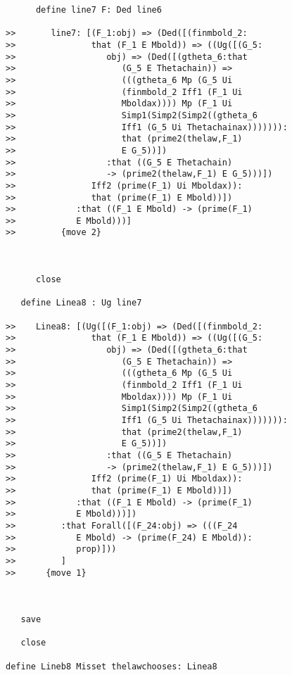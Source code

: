 \documentclass[12pt]{article}
\begin{document}
\begin{verbatim}
      define line7 F: Ded line6

>>       line7: [(F_1:obj) => (Ded([(finmbold_2:
>>               that (F_1 E Mbold)) => ((Ug([(G_5:
>>                  obj) => (Ded([(gtheta_6:that
>>                     (G_5 E Thetachain)) =>
>>                     (((gtheta_6 Mp (G_5 Ui
>>                     (finmbold_2 Iff1 (F_1 Ui
>>                     Mboldax)))) Mp (F_1 Ui
>>                     Simp1(Simp2(Simp2((gtheta_6
>>                     Iff1 (G_5 Ui Thetachainax))))))):
>>                     that (prime2(thelaw,F_1)
>>                     E G_5))])
>>                  :that ((G_5 E Thetachain)
>>                  -> (prime2(thelaw,F_1) E G_5)))])
>>               Iff2 (prime(F_1) Ui Mboldax)):
>>               that (prime(F_1) E Mbold))])
>>            :that ((F_1 E Mbold) -> (prime(F_1)
>>            E Mbold)))]
>>         {move 2}



      close

   define Linea8 : Ug line7

>>    Linea8: [(Ug([(F_1:obj) => (Ded([(finmbold_2:
>>               that (F_1 E Mbold)) => ((Ug([(G_5:
>>                  obj) => (Ded([(gtheta_6:that
>>                     (G_5 E Thetachain)) =>
>>                     (((gtheta_6 Mp (G_5 Ui
>>                     (finmbold_2 Iff1 (F_1 Ui
>>                     Mboldax)))) Mp (F_1 Ui
>>                     Simp1(Simp2(Simp2((gtheta_6
>>                     Iff1 (G_5 Ui Thetachainax))))))):
>>                     that (prime2(thelaw,F_1)
>>                     E G_5))])
>>                  :that ((G_5 E Thetachain)
>>                  -> (prime2(thelaw,F_1) E G_5)))])
>>               Iff2 (prime(F_1) Ui Mboldax)):
>>               that (prime(F_1) E Mbold))])
>>            :that ((F_1 E Mbold) -> (prime(F_1)
>>            E Mbold)))])
>>         :that Forall([(F_24:obj) => (((F_24
>>            E Mbold) -> (prime(F_24) E Mbold)):
>>            prop)]))
>>         ]
>>      {move 1}



   save

   close

define Lineb8 Misset thelawchooses: Linea8



\end{verbatim}
\end{document}
